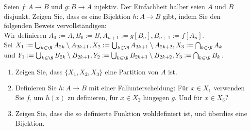 
\begin{exercise}[243]

Seien $f: A \to B$ und $g: B \to A$ injektiv. Der Einfachheit halber seien
$A$ und $B$ disjunkt. Zeigen Sie, dass es eine Bijektion $h: A \to B$ gibt,
indem Sie den folgenden Beweis vervollständigen: \\
Wir definieren $A_0 := A, B_0 := B, A_{n+1} := g[B_n], B_{n+1} := f[A_n]$. \\
Sei $X_1 := \bigcup_{k\in\N}A_{2k}\setminus A_{2k+1},
X_2 := \bigcup_{k\in\N}A_{2k+1}\setminus A_{2k+2}, X_3 := \bigcap_{k \in \N} A_k$ \\
und $Y_1 := \bigcup_{k\in\N}B_{2k}\setminus B_{2k+1},
Y_2 := \bigcup_{k\in\N}B_{2k+1}\setminus B_{2k+2}, Y_3 := \bigcap_{k \in \N} B_k$.

\begin{enumerate}[label = \alph*.]
  \item Zeigen Sie, dass $\{X_1,X_2,X_3\}$ eine Partition von $A$ ist.
  \item Definieren Sie $h: A \to B$ mit einer Fallunterscheidung:
  Für $x \in X_1$ verwenden Sie $f$, um $h(x)$ zu definieren, für $x \in X_2$
  hingegen $g$. Und für $x \in X_3?$
  \item Zeigen Sie, dass die so definierte Funktion wohldefiniert ist,
  und überdies eine Bijektion.
\end{enumerate}

\end{exercise}


